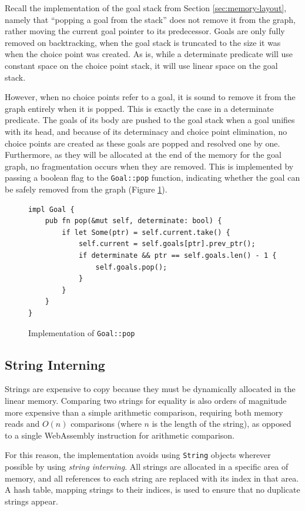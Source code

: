 Recall the implementation of the goal stack from Section \ref{sec:memory-layout}, namely that ``popping a goal from the stack'' does not remove it from the graph, rather moving the current goal pointer to its predecessor. Goals are only fully removed on backtracking, when the goal stack is truncated to the size it was when the choice point was created. As is, while a determinate predicate will use constant space on the choice point stack, it will use linear space on the goal stack.

However, when no choice points refer to a goal, it is sound to remove it from the graph entirely when it is popped. This is exactly the case in a determinate predicate. The goals of its body are pushed to the goal stack when a goal unifies with its head, and because of its determinacy and choice point elimination, no choice points are created as these goals are popped and resolved one by one. Furthermore, as they will be allocated at the end of the memory for the goal graph, no fragmentation occurs when they are removed. This is implemented by passing a boolean flag to the \texttt{Goal::pop} function, indicating whether the goal can be safely removed from the graph (Figure \ref{fig:goal-pop}).

\begin{figure}[H]
\centering
\begin{verbatim}
impl Goal {
    pub fn pop(&mut self, determinate: bool) {
        if let Some(ptr) = self.current.take() {
            self.current = self.goals[ptr].prev_ptr();
            if determinate && ptr == self.goals.len() - 1 {
                self.goals.pop();
            }
        }
    }
}
\end{verbatim}
\caption{Implementation of \texttt{Goal::pop}}
\label{fig:goal-pop}
\end{figure}

\subsection{String Interning}

Strings are expensive to copy because they must be dynamically allocated in the linear memory. Comparing two strings for equality is also orders of magnitude more expensive than a simple arithmetic comparison, requiring both memory reads and $O(n)$ comparisons (where $n$ is the length of the string), as opposed to a single WebAssembly instruction for arithmetic comparison.

For this reason, the implementation avoids using \texttt{String} objects wherever possible by using \emph{string interning}. All strings are allocated in a specific area of memory, and all references to each string are replaced with its index in that area. A hash table, mapping strings to their indices, is used to ensure that no duplicate strings appear.

